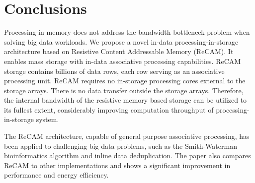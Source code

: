 \documentclass{superfri}
\begin{document}
	
	\section*{Conclusions}
	
	Processing-in-memory does not address the bandwidth bottleneck problem when solving big data workloads. We propose a novel in-data processing-in-storage architecture based on Resistive Content Addressable Memory (ReCAM). It enables mass storage with in-data associative processing capabilities. ReCAM storage contains billions of data rows, each row serving as an associative processing unit. ReCAM requires no in-storage processing cores external to the storage arrays. There is no data transfer outside the storage arrays. Therefore, the internal bandwidth of the resistive memory based storage can be utilized to its fullest extent, considerably improving computation throughput of processing-in-storage system.
	
	The ReCAM architecture, capable of general purpose associative processing, has been applied to challenging big data problems, such as the Smith-Waterman bioinformatics algorithm and inline data deduplication. The paper also compares ReCAM to other implementations and shows a significant improvement in performance and energy efficiency. 
	
	
	
	
	
\end{document}
